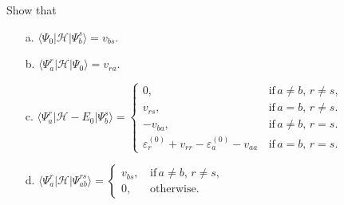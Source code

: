 \documentclass[a4paper]{book}
\newcounter{exercise}[chapter]
\begin{document}
	\begin{exercise}
	Show that
	\begin{enumerate}
	
	\item[a.] $\langle \Psi_0 | \mathscr{H} | \Psi^s_b \rangle = v_{bs}$.

	\item[b.] $\langle \Psi^r_a | \mathscr{H} | \Psi_0 \rangle = v_{ra}$.

	\item[c.] $\langle \Psi^r_a | \mathscr{H} - E_0 | \Psi^s_b \rangle = \begin{cases}
	0 , &\,\text{if} \, a\neq b, \, r \neq s, \\
	v_{rs} , &\,\text{if} \, a = b , \, r \neq s. \\
	-v_{ba} , &\,\text{if} \, a \neq b , \, r = s. \\
	\varepsilon^{(0)}_r + v_{rr} - \varepsilon^{(0)}_a - v_{aa} &\, \text{if} \, a = b , \, r = s.
\end{cases}
	$	
	
	\item[d.] $\langle \Psi^r_a | \mathscr{H} | \Psi^{rs}_{ab} \rangle = \begin{cases} v_{bs} , &\,\text{if} \, a \neq b, \, r \neq s, \\
	0, &\,\text{otherwise}. \end{cases}
	$
	
	\end{enumerate}
	\end{exercise}
	
\end{document}
